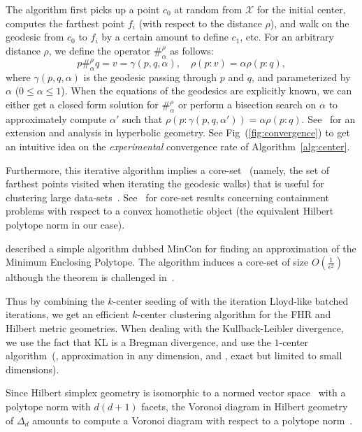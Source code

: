 \documentclass[graybox]{svmult}
\def\eps{\epsilon}
\def\calX{\mathcal{X}}
\begin{document}
The algorithm first picks up  a point $c_0$ at random from $\calX$ for the initial center, computes the farthest point $f_i$ (with respect to the distance $\rho$), and 
walk on the geodesic from $c_0$ to $f_i$ by a certain amount to define $c_1$, etc. 
For an arbitrary distance $\rho$, we define the operator $\#^\rho_\alpha$ as follows:
$$
p \#^\rho_\alpha q = v=\gamma(p,q,\alpha), \quad \rho(p:v)=\alpha \rho(p:q),
$$
where $\gamma(p,q,\alpha)$ is the geodesic passing through $p$ and $q$, and parameterized by $\alpha$ ($0\le\alpha\le1$).
When the equations of the geodesics are explicitly known, we can either get a closed form solution for $\#^\rho_\alpha$ or perform a bisection search on $\alpha$ to approximately compute $\alpha'$ such that $\rho(p:\gamma(p,q,\alpha'))=\alpha \rho(p:q)$.
See~\cite{ApproximatingHyperbolicBall-2015} for an extension and analysis in hyperbolic geometry.
See Fig~(\ref{fig:convergence}) to get an intuitive idea on the {\em experimental} convergence rate of Algorithm~\ref{alg:center}.

Furthermore, this iterative algorithm implies a core-set~\cite{coreset-2008} (namely, the set of farthest points visited when iterating the geodesic walks) that is useful for clustering large data-sets~\cite{coreset-2017}.
See~\cite{Brandenberg-2013} for core-set results concerning containment problems with respect to a convex homothetic object (the equivalent Hilbert polytope norm in our case).

\cite{EnclosingPolytope-2004} described a simple algorithm dubbed {\sc MinCon} for finding an approximation of the Minimum Enclosing Polytope.
The algorithm induces a core-set of size $O(\frac{1}{\eps^2})$ although the theorem is challenged in~\cite{Brandenberg-2013}.




Thus by combining the $k$-center seeding of \cite{kcenter-1985} with the iteration Lloyd-like batched iterations, we get an efficient $k$-center clustering
algorithm for the FHR and Hilbert metric geometries.
When dealing with the Kullback-Leibler divergence, we use the fact that KL is a Bregman divergence, and use 
the $1$-center algorithm~(\cite{BregmanMinimax-2005,BregmanBall-2006}, approximation in any dimension,
and \cite{SEBB-2008}, exact but limited to small dimensions).

Since Hilbert simplex geometry is isomorphic to a normed vector space~\cite{BH-2014} with
a polytope norm with $d(d+1)$ facets, the Voronoi diagram in Hilbert geometry of $\Delta_d$ amounts to 
compute a Voronoi diagram with respect to a polytope norm~\cite{MinisumHypersphere-2011,VoronoiNorm-2012,voronoi-2015}.
\end{document}
